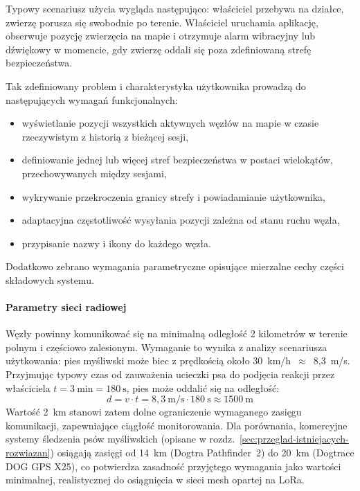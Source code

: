Typowy scenariusz użycia wygląda następująco: właściciel przebywa na działce, zwierzę porusza się
swobodnie po terenie. Właściciel uruchamia aplikację, obserwuje pozycję zwierzęcia na mapie i otrzymuje
alarm wibracyjny lub dźwiękowy w momencie, gdy zwierzę oddali się poza zdefiniowaną strefę
bezpieczeństwa.


Tak zdefiniowany problem i charakterystyka użytkownika prowadzą do następujących wymagań funkcjonalnych:
\begin{itemize}
    \item wyświetlanie pozycji wszystkich aktywnych węzłów na mapie w czasie rzeczywistym
          z historią z bieżącej sesji,
    \item definiowanie jednej lub więcej stref bezpieczeństwa w postaci wielokątów,
          przechowywanych między sesjami,
    \item wykrywanie przekroczenia granicy strefy i powiadamianie użytkownika,
    \item adaptacyjna częstotliwość wysyłania pozycji zależna od stanu ruchu węzła,
    \item przypisanie nazwy i ikony do każdego węzła.
\end{itemize}

Dodatkowo zebrano wymagania parametryczne opisujące mierzalne cechy części składowych systemu.

\paragraph{Parametry sieci radiowej}
Węzły powinny komunikować się na minimalną odległość 2 kilometrów w terenie polnym i częściowo zalesionym.
Wymaganie to wynika z analizy scenariusza użytkowania: pies myśliwski może biec z prędkością
około 30~km/h~$\approx$~8,3~m/s. Przyjmując typowy czas od zauważenia ucieczki psa
do podjęcia reakcji przez właściciela $t = 3~\text{min} = 180~\text{s}$, pies może
oddalić się na odległość:
\begin{equation}
     d = v \cdot t = 8{,}3~\text{m/s} \cdot 180~\text{s} \approx 1500~\text{m}
\end{equation}
Wartość 2~km stanowi zatem dolne ograniczenie wymaganego zasięgu komunikacji,
zapewniające ciągłość monitorowania.
Dla porównania, komercyjne systemy śledzenia psów myśliwskich (opisane w rozdz.~\ref{sec:przeglad-istniejacych-rozwiazan}) osiągają zasięgi od 14~km (Dogtra Pathfinder~2)
do 20~km (Dogtrace DOG GPS X25), co potwierdza zasadność przyjętego wymagania
jako wartości minimalnej, realistycznej do osiągnięcia w sieci mesh opartej na LoRa.

